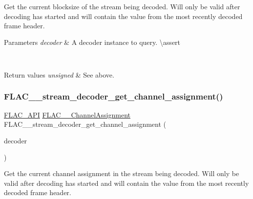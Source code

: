 Get the current blocksize of the stream being decoded. Will only be valid after decoding has started and will contain the value from the most recently decoded frame header.


\begin{DoxyParams}{Parameters}
{\em decoder} & A decoder instance to query. \textbackslash{}assert 
\begin{DoxyCode}{1}
\end{DoxyCode}
 \\
\hline
\end{DoxyParams}

\begin{DoxyRetVals}{Return values}
{\em unsigned} & See above. \\
\hline
\end{DoxyRetVals}
\mbox{\label{group__flac__stream__decoder_gad7906d840eef5c15ef5c8fe4571d1172}} 
\subsubsection{\texorpdfstring{FLAC\_\_stream\_decoder\_get\_channel\_assignment()}{FLAC\_\_stream\_decoder\_get\_channel\_assignment()}}
{\footnotesize\ttfamily \mbox{\hyperlink{group__flac__export_ga56ca07df8a23310707732b1c0007d6f5}{F\+L\+A\+C\+\_\+\+A\+PI}} \mbox{\hyperlink{group__flac__format_ga79855f8525672e37f299bbe02952ef9c}{F\+L\+A\+C\+\_\+\+\_\+\+Channel\+Assignment}} F\+L\+A\+C\+\_\+\+\_\+stream\+\_\+decoder\+\_\+get\+\_\+channel\+\_\+assignment (\begin{DoxyParamCaption}\item[{const \mbox{\hyperlink{struct_f_l_a_c_____stream_decoder}{F\+L\+A\+C\+\_\+\+\_\+\+Stream\+Decoder}} $\ast$}]{decoder }\end{DoxyParamCaption})}

Get the current channel assignment in the stream being decoded. Will only be valid after decoding has started and will contain the value from the most recently decoded frame header.


